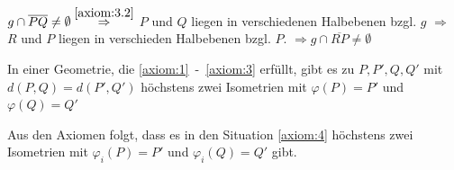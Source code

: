 \begin{beweis}
    $g \cap \overline{PQ} \neq \emptyset \stackrel{\ref{axiom:3.2}}{\Rightarrow}$
    $P$ und $Q$ liegen in verschiedenen Halbebenen bzgl. $g$
    $\Rightarrow$ \obda $R$ und $P$ liegen in verschieden
    Halbebenen bzgl. $P$.
    $\Rightarrow g \cap \overline{RP} \neq \emptyset$
\end{beweis}

\begin{proposition}%
    In einer Geometrie, die \ref{axiom:1}~-~\ref{axiom:3} erfüllt,
    gibt es zu $P, P', Q, Q'$ mit $d(P, Q) = d(P', Q')$ höchstens
    zwei Isometrien mit $\varphi(P) = P'$ und $\varphi(Q) = Q'$

    Aus den Axiomen  folgt, dass es in 
    den Situation \ref{axiom:4} höchstens zwei Isometrien mit
    $\varphi_i(P) = P'$ und $\varphi_i(Q) = Q'$ gibt.
\end{proposition}

